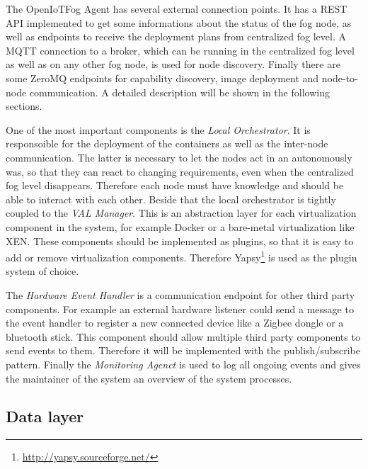 The OpenIoTFog Agent has several external connection points.
It has a \ac{REST} \ac{API} implemented to get some informations about the status of the fog node, as well as endpoints to receive the deployment plans from centralized fog level.
A \ac{MQTT} connection to a broker, which can be running in the centralized fog level as well as on any other fog node, is used for node discovery.
Finally there are some ZeroMQ endpoints for capability discovery, image deployment and node-to-node communication.
A detailed description will be shown in the following sections.

One of the most important components is the \textit{Local Orchestrator}.
It is responsoible for the deployment of the containers as well as the inter-node communication.
The latter is necessary to let the nodes act in an autonomously was, so that they can react to changing requirements, even when the centralized fog level disappears.
Therefore each node must have knowledge and should be able to interact with each other.
Beside that the local orchestrator is tightly coupled to the \textit{\ac{VAL} Manager}.
This is an abstraction layer for each virtualization component in the system, for example Docker or a bare-metal virtualization like XEN.
These components should be implemented as plugins, so that it is easy to add or remove virtualization components.
Therefore Yapsy\footnote{\url{http://yapsy.sourceforge.net/}} is used as the plugin system of choice.

The \textit{Hardware Event Handler} is a communication endpoint for other third party components.
For example an external hardware listener could send a message to the event handler to register a new connected device like a Zigbee dongle or a bluetooth stick.
This component should allow multiple third party components to send events to them.
Therefore it will be implemented with the publish/subscribe pattern.
Finally the \textit{Monitoring Agenct} is used to log all ongoing events and gives the maintainer of the system an overview of the system processes.


\subsection{Data layer}
\doit

